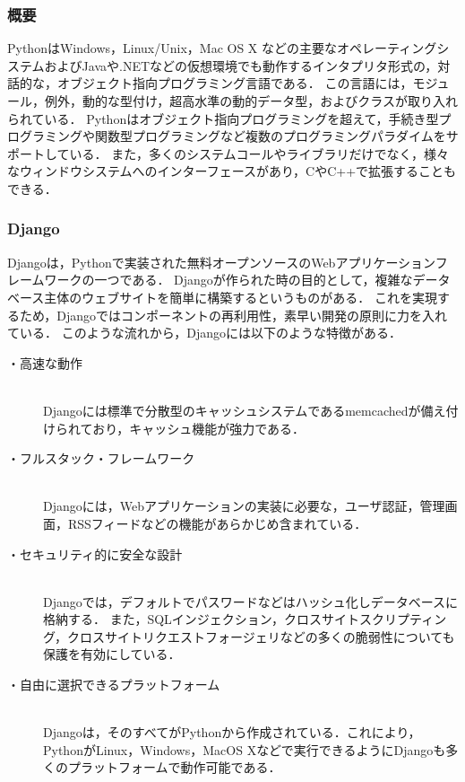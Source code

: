 \subsubsection{概要}
Python\cite{python}はWindows，Linux/Unix，Mac OS X などの主要なオペレーティングシステムおよびJavaや.NETなどの仮想環境でも動作するインタプリタ形式の，対話的な，オブジェクト指向プログラミング言語である．
この言語には，モジュール，例外，動的な型付け，超高水準の動的データ型，およびクラスが取り入れられている．
Pythonはオブジェクト指向プログラミングを超えて，手続き型プログラミングや関数型プログラミングなど複数のプログラミングパラダイムをサポートしている．
また，多くのシステムコールやライブラリだけでなく，様々なウィンドウシステムへのインターフェースがあり，C\cite{Clang}やC++\cite{cplusplus}で拡張することもできる．

\subsubsection{Django}
Django\cite{Django}は，Pythonで実装された無料オープンソースのWebアプリケーションフレームワークの一つである．
Djangoが作られた時の目的として，複雑なデータベース主体のウェブサイトを簡単に構築するというものがある．
これを実現するため，Djangoではコンポーネントの再利用性，素早い開発の原則に力を入れている．
このような流れから，Djangoには以下のような特徴がある．

\begin{description}
    \item[・高速な動作]\mbox{}\\
        Djangoには標準で分散型のキャッシュシステムであるmemcached\cite{memcached}が備え付けられており，キャッシュ機能が強力である．
    \item[・フルスタック・フレームワーク]\mbox{}\\
        Djangoには，Webアプリケーションの実装に必要な，ユーザ認証，管理画面，RSSフィードなどの機能があらかじめ含まれている．
    \item[・セキュリティ的に安全な設計]\mbox{}\\
        Djangoでは，デフォルトでパスワードなどはハッシュ化しデータベースに格納する．
        また，SQLインジェクション，クロスサイトスクリプティング，クロスサイトリクエストフォージェリなどの多くの脆弱性についても保護を有効にしている．
    \item[・自由に選択できるプラットフォーム]\mbox{}\\
        Djangoは，そのすべてがPythonから作成されている．これにより，PythonがLinux，Windows，MacOS Xなどで実行できるようにDjangoも多くのプラットフォームで動作可能である．
\end{description}


